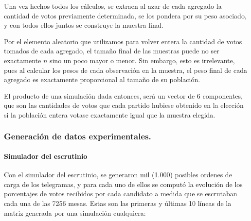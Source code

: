 \documentclass[12pt, a4paper]{article}
\begin{document}
Una vez hechos todos los c\'alculos, se extraen al azar de cada agregado la cantidad de votos previamente determinada, se los pondera por su peso asociado, y con todos ellos juntos se construye la muestra final.

Por el elemento aleatorio que utilizamos para volver entera la cantidad de votos tomados de cada agregado, el tama\~no final de las muestras puede no ser exactamente $n$ sino un poco mayor o menor. Sin embargo, esto es irrelevante, pues al calcular los pesos de cada observaci\'on en la muestra, el peso final de cada agregado es exactamente proporcional al tama\~no de su poblaci\'on.

El producto de una simulaci\'on dada entonces, ser\'a un vector de 6 componentes, que son las cantidades de votos que cada partido hubiese obtenido en la elecci\'on si la poblaci\'on entera votase exactamente igual que la muestra elegida.

\subsubsection{Generaci\'on de datos experimentales.}

\paragraph{Simulador del escrutinio}

Con el simulador del escrutinio, se generaron mil (1.000) posibles ordenes de carga de los telegramas, y para cada uno de ellos se comput\'o la evoluci\'on de los porcentajes de votos recibidos por cada candidato a medida que se escrutaban cada una de las 7256 mesas. Estas son las primeras y \'ultimas 10 l\'ineas de la matriz generada por una simulaci\'on cualquiera:
\end{document}

